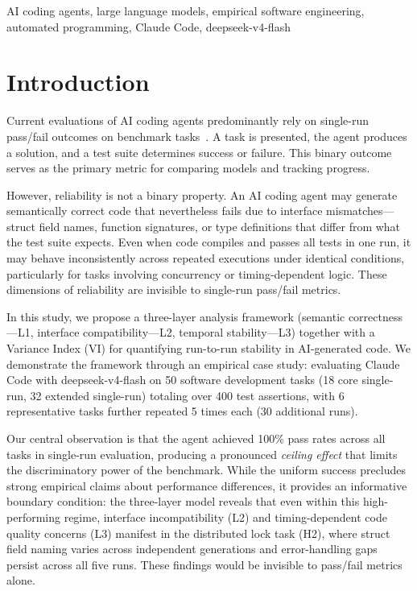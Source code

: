 \documentclass[conference]{IEEEtran}
\begin{document}
\begin{IEEEkeywords}
AI coding agents, large language models, empirical software engineering, automated programming, Claude Code, deepseek-v4-flash
\end{IEEEkeywords}

\section{Introduction}

Current evaluations of AI coding agents predominantly rely on single-run pass/fail outcomes on benchmark tasks~\cite{chen2021evaluating, austin2021program, jimenez2023swebench}. A task is presented, the agent produces a solution, and a test suite determines success or failure. This binary outcome serves as the primary metric for comparing models and tracking progress.

However, reliability is not a binary property. An AI coding agent may generate semantically correct code that nevertheless fails due to interface mismatches---struct field names, function signatures, or type definitions that differ from what the test suite expects. Even when code compiles and passes all tests in one run, it may behave inconsistently across repeated executions under identical conditions, particularly for tasks involving concurrency or timing-dependent logic. These dimensions of reliability are invisible to single-run pass/fail metrics.

In this study, we propose a three-layer analysis framework (semantic correctness---L1, interface compatibility---L2, temporal stability---L3) together with a Variance Index (VI) for quantifying run-to-run stability in AI-generated code. We demonstrate the framework through an empirical case study: evaluating Claude Code with deepseek-v4-flash on 50 software development tasks (18 core single-run, 32 extended single-run) totaling over 400 test assertions, with 6 representative tasks further repeated 5 times each (30 additional runs).

Our central observation is that the agent achieved 100\% pass rates across all tasks in single-run evaluation, producing a pronounced \emph{ceiling effect} that limits the discriminatory power of the benchmark. While the uniform success precludes strong empirical claims about performance differences, it provides an informative boundary condition: the three-layer model reveals that even within this high-performing regime, interface incompatibility (L2) and timing-dependent code quality concerns (L3) manifest in the distributed lock task (H2), where struct field naming varies across independent generations and error-handling gaps persist across all five runs. These findings would be invisible to pass/fail metrics alone.
\end{document}
